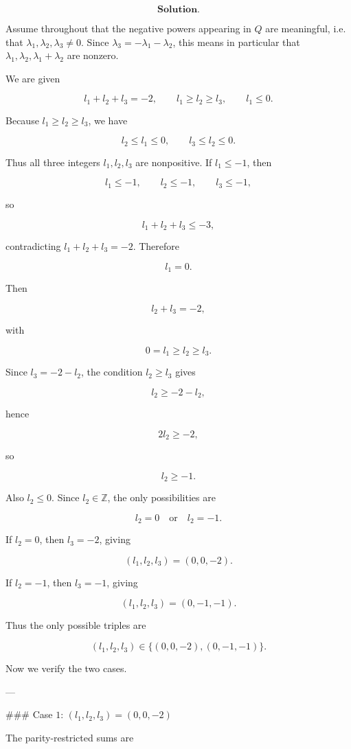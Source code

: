 \[
\textbf{Solution.}
\]

Assume throughout that the negative powers appearing in $Q$ are meaningful, i.e. that $\lambda_1,\lambda_2,\lambda_3\neq 0$. Since $\lambda_3=-\lambda_1-\lambda_2$, this means in particular that $\lambda_1,\lambda_2,\lambda_1+\lambda_2$ are nonzero.

We are given

\[
l_1+l_2+l_3=-2,\qquad l_1\ge l_2\ge l_3,\qquad l_1\le 0.
\]

Because $l_1\ge l_2\ge l_3$, we have

\[
l_2\le l_1\le 0,\qquad l_3\le l_2\le 0.
\]

Thus all three integers $l_1,l_2,l_3$ are nonpositive. If $l_1\le -1$, then

\[
l_1\le -1,\qquad l_2\le -1,\qquad l_3\le -1,
\]

so

\[
l_1+l_2+l_3\le -3,
\]

contradicting $l_1+l_2+l_3=-2$. Therefore

\[
l_1=0.
\]

Then

\[
l_2+l_3=-2,
\]

with

\[
0=l_1\ge l_2\ge l_3.
\]

Since $l_3=-2-l_2$, the condition $l_2\ge l_3$ gives

\[
l_2\ge -2-l_2,
\]

hence

\[
2l_2\ge -2,
\]

so

\[
l_2\ge -1.
\]

Also $l_2\le 0$. Since $l_2\in\mathbb Z$, the only possibilities are

\[
l_2=0 \quad\text{or}\quad l_2=-1.
\]

If $l_2=0$, then $l_3=-2$, giving

\[
(l_1,l_2,l_3)=(0,0,-2).
\]

If $l_2=-1$, then $l_3=-1$, giving

\[
(l_1,l_2,l_3)=(0,-1,-1).
\]

Thus the only possible triples are

\[
(l_1,l_2,l_3)\in\{(0,0,-2),(0,-1,-1)\}.
\]

Now we verify the two cases.

---

### Case $1$: \((l_1,l_2,l_3)=(0,0,-2)\)

The parity-restricted sums are


